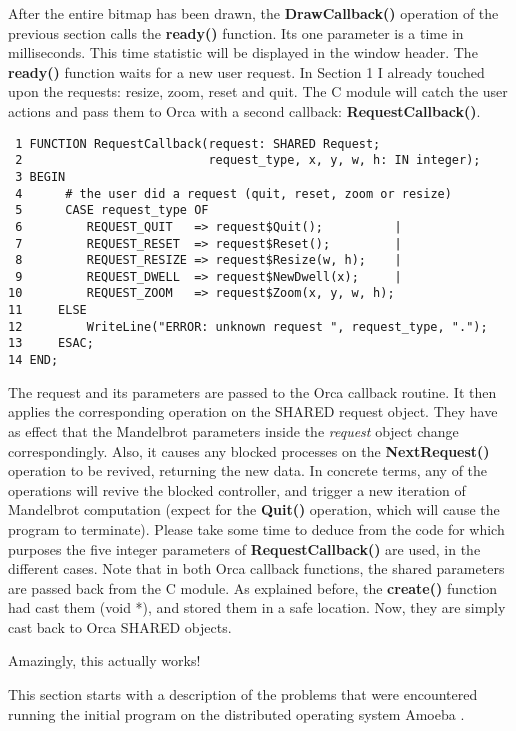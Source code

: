 After the entire bitmap has been drawn, the {\bf DrawCallback()} operation
of the previous section calls the {\bf ready()} function.
Its one parameter is a time in milliseconds. This time statistic
will be displayed in the window header.  
The {\bf ready()} function waits for a new user request. In Section 1 I already
touched upon the requests: resize, zoom, reset and quit. 
\Skip
The C module will catch the user actions and pass them to Orca with a second 
callback: {\bf RequestCallback()}.
\begin{verbatim}
 1 FUNCTION RequestCallback(request: SHARED Request; 
 2                          request_type, x, y, w, h: IN integer);
 3 BEGIN
 4      # the user did a request (quit, reset, zoom or resize)
 5      CASE request_type OF
 6         REQUEST_QUIT   => request$Quit();          |
 7         REQUEST_RESET  => request$Reset();         |
 8         REQUEST_RESIZE => request$Resize(w, h);    |
 9         REQUEST_DWELL  => request$NewDwell(x);     |
10         REQUEST_ZOOM   => request$Zoom(x, y, w, h);	
11     ELSE
12         WriteLine("ERROR: unknown request ", request_type, ".");
13     ESAC;
14 END;
\end{verbatim}
The request and its parameters are passed to the Orca callback routine. It
then applies the corresponding operation on the SHARED request object. 
They have as effect that the Mandelbrot parameters inside the {\em request}
object change correspondingly. Also, it causes any blocked processes on the
{\bf NextRequest()} operation to be revived, returning the new data. In
concrete terms, any of the operations will revive the blocked controller,
and trigger a new iteration of Mandelbrot computation (expect for the 
{\bf Quit()} operation, which will cause the program to terminate).
\Skip
Please take some time to deduce from the code for which purposes the five 
integer parameters of {\bf RequestCallback()} are used, in the different cases.
\Skip
Note that in both Orca callback functions, the shared parameters
are passed back from the C module. As explained before, the {\bf create()}
function had cast them (void *), and stored them in a safe location. Now, 
they are simply cast back to Orca SHARED objects. 

Amazingly, this actually works!

\newpage

 \label{label:Amoeba}

This section starts with a description of the problems that were 
encountered running the initial program on the distributed operating 
system Amoeba \cite{amoeba:652}. 

